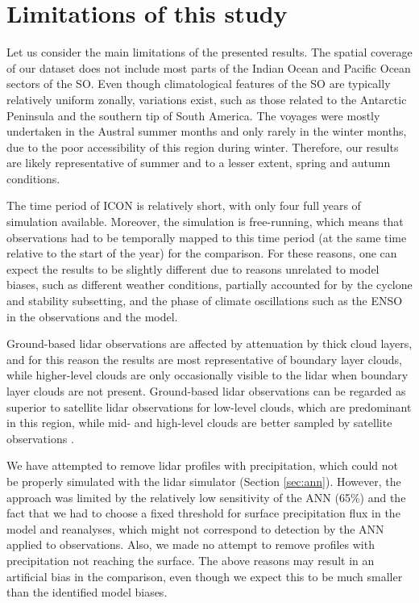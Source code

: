 \documentclass[12pt,a4paper]{article}
\begin{document}
\section{Limitations of this study}

Let us consider the main limitations of the presented results. The spatial
coverage of our dataset does not include most parts of the Indian Ocean and
Pacific Ocean sectors of the SO. Even though climatological features of the SO
are typically relatively uniform zonally, variations exist, such as those
related to the Antarctic Peninsula and the southern tip of South America. The
voyages were mostly undertaken in the Austral summer months and only rarely in
the winter months, due to the poor accessibility of this region during winter.
Therefore, our results are likely representative of summer and to a lesser
extent, spring and autumn conditions.

The time period of ICON is relatively short, with only four full years of
simulation available. Moreover, the simulation is free-running, which means
that observations had to be temporally mapped to this time period (at the same
time relative to the start of the year) for the comparison. For these reasons,
one can expect the results to be slightly different due to reasons unrelated to
model biases, such as different weather conditions, partially accounted for by
the cyclone and stability subsetting, and the phase of climate oscillations
such as the ENSO in the observations and the model.

Ground-based lidar observations are affected by attenuation by thick cloud
layers, and for this reason the results are most representative of boundary
layer clouds, while higher-level clouds are only occasionally visible to the
lidar when boundary layer clouds are not present. Ground-based lidar
observations can be regarded as superior to satellite lidar observations for
low-level clouds, which are predominant in this region, while mid- and
high-level clouds are better sampled by satellite observations
\citep{mcerlich2021}.

We have attempted to remove lidar profiles with precipitation, which could not
be properly simulated with the lidar simulator (Section \ref{sec:ann}).
However, the approach was limited by the relatively low sensitivity of the ANN
(65\%) and the fact that we had to choose a fixed threshold for surface
precipitation flux in the model and reanalyses, which might not correspond to
detection by the ANN applied to observations. Also, we made no attempt to
remove profiles with precipitation not reaching the surface. The above reasons
may result in an artificial bias in the comparison, even though we expect this
to be much smaller than the identified model biases.
\end{document}
